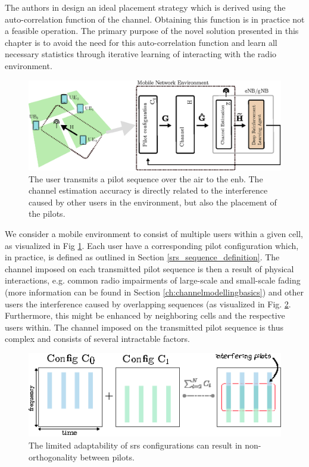 The authors in \cite{Simko2013AdaptiveSystems} design an ideal placement strategy which is derived using the auto-correlation function of the channel. Obtaining this function is in practice not a feasible operation. The primary purpose of the novel solution presented in this chapter is to avoid the need for this auto-correlation function and learn all necessary statistics through iterative learning of interacting with the radio environment. 

\begin{figure}
\includegraphics[width=\textwidth]{chapters/part_uplink/figures/RL_introduction_maindrawing.eps}
\caption{The user transmits a pilot sequence over the air to the \gls{enb}. The channel estimation accuracy is directly related to the interference caused by other users in the environment, but also the placement of the pilots.}\label{fig:RL_introduction_maindrawing}
\end{figure}


We consider a mobile environment to consist of multiple users within a given cell, as visualized in Fig \ref{fig:RL_introduction_maindrawing}. Each user have a corresponding pilot configuration which, in practice, is defined as outlined in Section \ref{srs_sequence_definition}. The channel imposed on each transmitted pilot sequence is then a result of physical interactions, e.g. common radio impairments of large-scale and small-scale fading (more information can be found in Section \ref{ch:channelmodellingbasics}) and other users the interference caused by overlapping sequences (as visualized in Fig. \ref{fig:RL_srs_configuration_overlap}. Furthermore, this might be enhanced by neighboring cells and the respective users within. The channel imposed on the transmitted pilot sequence is thus complex and consists of several intractable factors. 

\begin{figure}
    \centering
    \includegraphics{chapters/part_uplink/figures/RL_srs_configuration_overlap.eps}
    \caption{The limited adaptability of \gls{srs} configurations can result in non-orthogonality between pilots.}\label{fig:RL_srs_configuration_overlap}
\end{figure}


